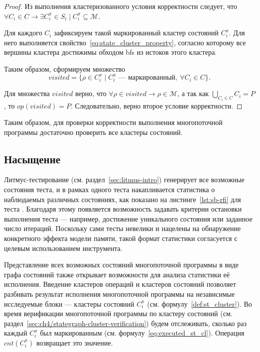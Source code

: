 \begin{proof}
  Из выполнения кластеризованного условия корректности следует, что
  $\forall C_i \in C \rightarrow \exists C_i^\pi \in S_i \mid C_i^\pi
  \subseteq \mathcal{M}$.

  Для каждого $C_i$ зафиксируем такой маркированный кластер состояний
  $C_i^\pi$. Для него выполняется
  свойство~\ref{eq:state_cluster_property}, согласно которому все
  вершины кластера достижимы обходом bfs из истоков этого кластера.

  Таким образом, сформируем множество
  \begin{equation}
    visited = \{ \rho \in C_i^\pi \mid C_i^\pi \text{ —
    маркированный},\ \forall C_i \in C \}.
  \end{equation}

  Для множества $visited$ верно, что $\forall \rho \in visited
  \rightarrow \rho \in \mathcal{M}$, а так как $\bigcup\limits_{C_i
  \in C}{C_i} = P$, то $op(visited) = P$. Следовательно, верно второе
  условие корректности.
\end{proof}

Таким образом, для проверки корректности выполнения многопоточной
программы достаточно проверить все кластеры состояний.

\subsection{Насыщение}
\label{sec:ch4/saturation}

Литмус-тестирование (см. раздел~\ref{sec:litmus-intro}) генерирует
все возможные состояния теста, и в рамках одного теста накапливается
статистика о наблюдаемых различных состояниях, как показано на
листинге~\ref{lst:sb-rfi} для теста .
Благодаря этому появляется возможность задавать критерии остановки
выполнения теста — например, достижение уникального состояния или
заданное число итераций. Поскольку сами тесты невелики и
нацелены на обнаружение конкретного эффекта модели памяти, такой
формат статистики согласуется с целевым использованием инструмента.

\begin{minipage}{\textwidth}
  \centering
  
\end{minipage}

Представление всех возможных состояний многопоточной программы в виде
графа состояний также открывает возможности для анализа статистики её
исполнения. Введение кластеров операций и кластеров состояний
позволяет разбивать результат исполнения многопоточной программы на
независимые исследуемые блоки — кластеры состояний $C_i^\pi$ (см.
формулу~\ref{def:st_cluster}). Во
время верификации многопоточной программы по кластеру состояний (см.
раздел~\ref{sec:ch4/stategraph-cluster-verification}) будем
отслеживать, сколько раз каждый $C_i^\pi$ был маркированным (см.
формулу~\ref{eq:executed_st_cl}). Операция $cnt(C_i^\pi)$ возвращает
это значение.

